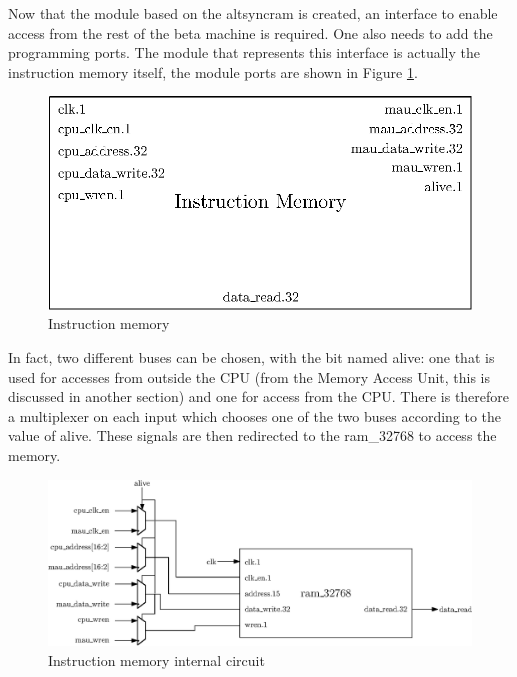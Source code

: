 Now that the module based on the altsyncram is created,  an interface to enable 
access from the rest of the beta machine is required. One also needs to add the programming ports. The
module that represents this interface is actually the instruction memory itself, the module ports
are shown in Figure \ref{fig:components/im}.

\begin{figure}[H]
    \centering
    \includegraphics[scale=0.8]{Chapter3-CPU/res/instruction_memory}
    \caption{Instruction memory}
    \label{fig:components/im}
\end{figure}

In fact, two different buses can be chosen, with the bit named alive: one that is used for 
accesses from outside the CPU (from the Memory Access Unit, this is discussed in another 
section) and one for access from the CPU. There is therefore a multiplexer on each input which
chooses one of the two buses according to the value of alive. These signals are then redirected to 
the ram\_32768 to access the memory.

\begin{figure}[H]
    \centering
    \includegraphics[width=\linewidth]{Chapter3-CPU/res/instruction_memory_in}
    \caption{Instruction memory internal circuit}
    \label{fig:components/im_in}
\end{figure}

